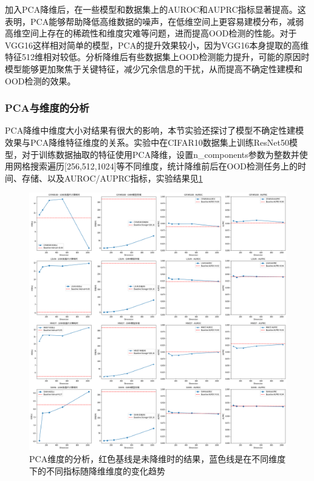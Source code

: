 加入PCA降维后，在一些模型和数据集上的AUROC和AUPRC指标显著提高。这表明，PCA能够帮助降低高维数据的噪声，在低维空间上更容易建模分布，减弱高维空间上存在的稀疏性和维度灾难等问题，进而提高OOD检测的性能。对于VGG16这样相对简单的模型，PCA的提升效果较小，因为VGG16本身提取的高维特征512维相对较低。分析降维后有些数据集上OOD检测能力提升，可能的原因时模型能够更加聚焦于关键特征，减少冗余信息的干扰，从而提高不确定性建模和OOD检测的效果。



\subsubsection{PCA与维度的分析}

PCA降维中维度大小对结果有很大的影响，本节实验还探讨了模型不确定性建模效果与PCA降维特征维度的关系。实验中在CIFAR10数据集上训练ResNet50模型，对于训练数据抽取的特征使用PCA降维，设置n\_components参数为整数并使用网格搜索遍历[256,512,1024]等不同维度，统计降维前后在OOD检测任务上的时间、存储、以及AUROC/AUPRC指标，实验结果见\ref{fig:PCA-dimension}

\begin{figure}[h]
    \captionsetup{font=small, justification=centering}
    \includegraphics[width=1.\linewidth]{assets/pca_plots_dimension.png}
    \caption{PCA维度的分析，红色基线是未降维时的结果，蓝色线是在不同维度下的不同指标随降维维度的变化趋势}
    \label{fig:PCA-dimension}
\end{figure}

